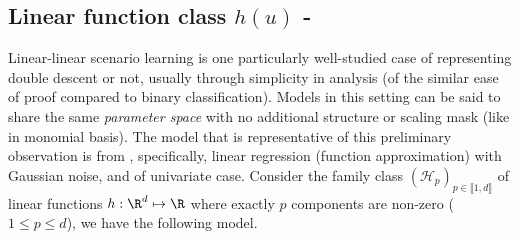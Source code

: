 \documentclass[10pt]{article} %
\begin{document}
\subsection{Linear function class $h(u)$ - \cite{lafon_understanding_2024}}

Linear-linear scenario learning is one particularly well-studied case of representing double descent or not, usually through simplicity in analysis (of the similar ease of proof compared to binary classification). Models in this setting can be said to share the same \textit{parameter space} with no additional structure or scaling mask (like in monomial basis). The model that is representative of this preliminary observation is from \cite{lafon_understanding_2024}, specifically, linear regression (function approximation) with Gaussian noise, and of univariate case. Consider the family class $(\mathcal{H}_p)_{p\in\llbracket1,d\rrbracket}$ of linear functions $h:\R^d\mapsto \R$ where exactly $p$ components are non-zero ($1\leq p\leq d$), we have the following model.
\end{document}
